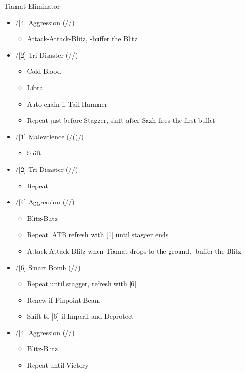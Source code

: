 \begin{multicols}{2}
\begin{menu}
\end{menu}
\renewcommand{\first}{[1]/[5] Tireless Charge ((\com)/\com/\med)}
\renewcommand{\second}{[2]/[4] Aggression (\com/\com/\rav)}
\renewcommand{\third}{[3]/[3] Consolidation (\sen/\sen/\med)}
\renewcommand{\fourth}{[4]/[1] Malevolence (\syn/(\rav)/\rav)}
\renewcommand{\fifth}{[5]/[6] Smart Bomb (\rav/\rav/\sab)}
\renewcommand{\sixth}{[6]/[2] Tri-Disaster (\rav/\rav/\rav)}
\begin{battle}{Tiamat Eliminator}
\begin{itemize}
    \item \second
    \begin{itemize}
        \item Attack-Attack-Blitz, \rav-buffer the Blitz
    \end{itemize}
    \item \sixth
    \begin{itemize}
        \item Cold Blood
        \item Libra
        \item Auto-chain if Tail Hammer
        \item Repeat just before Stagger, shift after Sazh fires the first bullet
    \end{itemize}
    \item \fourth
    \begin{itemize}
        \item Shift
    \end{itemize}
    \item \sixth
    \begin{itemize}
        \item Repeat
    \end{itemize}
    \item \second
    \begin{itemize}
        \item Blitz-Blitz
        \item Repeat, ATB refresh with [1] until stagger ends
        \item Attack-Attack-Blitz when Tiamat drops to the ground, \rav-buffer the Blitz
    \end{itemize}
    \item \fifth
    \begin{itemize}
        \item Repeat until stagger, refresh with [6]
        \item Renew if Pinpoint Beam
        \item Shift to [6] if Imperil and Deprotect
    \end{itemize}
    \item \second
    \begin{itemize}
        \item Blitz-Blitz
        \item Repeat until Victory
    \end{itemize}
\end{itemize}
\end{battle}


\end{multicols}
